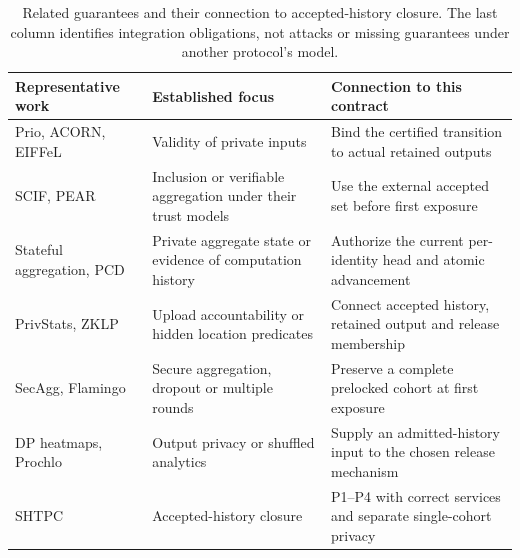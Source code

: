 \documentclass[conference,compsoc]{IEEEtran}
\theoremstyle{definition}
\numberwithin{equation}{section}
\numberwithin{table}{section}
\numberwithin{figure}{section}
\theoremstyle{plain}
\begin{document}
\begin{table}[b]
\centering
\caption{Related guarantees and their connection to accepted-history closure. The last column identifies integration obligations, not attacks or missing guarantees under another protocol's model.}
\label{tab:related-comparison}
\footnotesize
\setlength{\tabcolsep}{3pt}
\begin{tabularx}{\textwidth}{@{}>{\raggedright\arraybackslash}p{}YY@{}}
\toprule
Representative work & Established focus & Connection to this contract \\
\midrule
Prio, ACORN, EIFFeL~\cite{Corrigan2017Prio,Bell2023ACORN,Chowdhury2022EIFFeL} & Validity of private inputs & Bind the certified transition to actual retained outputs \\
SCIF, PEAR~\cite{Su2025SCIF,Acharya2025PEAR} & Inclusion or verifiable aggregation under their trust models & Use the external accepted set before first exposure \\
Stateful aggregation, PCD~\cite{Ball2024Stateful,Chiesa2010PCD} & Private aggregate state or evidence of computation history & Authorize the current per-identity head and atomic advancement \\
PrivStats, ZKLP~\cite{Popa2011PrivStats,Ernstberger2025ZKLP} & Upload accountability or hidden location predicates & Connect accepted history, retained output and release membership \\
SecAgg, Flamingo~\cite{Bonawitz2017SecureAggregation,Ma2023Flamingo} & Secure aggregation, dropout or multiple rounds & Preserve a complete prelocked cohort at first exposure \\
DP heatmaps, Prochlo~\cite{Bagdasaryan2022SparseHeatmaps,Bittau2017Prochlo} & Output privacy or shuffled analytics & Supply an admitted-history input to the chosen release mechanism \\
SHTPC & Accepted-history closure & P1--P4 with correct services and separate single-cohort privacy \\
\bottomrule
\end{tabularx}
\end{table}
\end{document}
